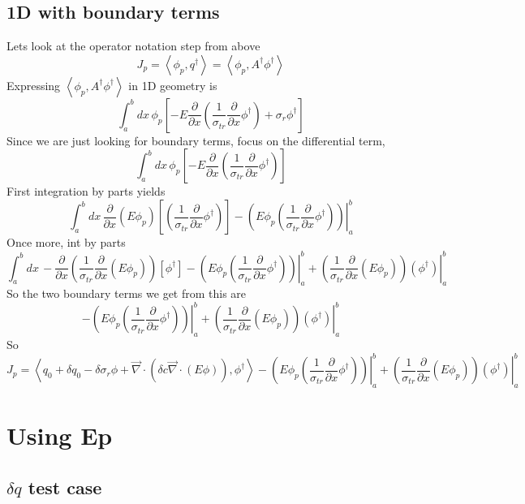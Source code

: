 \documentclass{article}
\newcommand{\bra}{\left\langle}
\newcommand{\ket}{\right\rangle}
\newcommand{\vdiv}{\vec{\nabla} \cdot}
\newcommand{\pdx}{\frac{\partial}{\partial x}}
\begin{document}
\subsection{1D with boundary terms}
Lets look at the operator notation step from above
\[
J_p = \bra \phi_p , q^\dag \ket = \bra \phi_p , A^\dag \phi^\dag\ket
\]
Expressing $\bra \phi_p , A^\dag \phi^\dag\ket$ in 1D geometry is
\[\int_a^b dx \, \phi_p \left[ - E  \pdx \left( \frac{1}{\sigma_{tr}} \pdx \phi^\dag \right) 
+ \sigma_r \phi^\dag \right]
\]
Since we are just looking for boundary terms, focus on the differential term,
\[\int_a^b dx \, \phi_p \left[ - E  \pdx \left( \frac{1}{\sigma_{tr}} \pdx \phi^\dag \right) \right]
\]
First integration by parts yields
\[\int_a^b dx \, \pdx \left( E \phi_p \right) \left[ \left( \frac{1}{\sigma_{tr}} \pdx \phi^\dag \right) \right] - \left. \left( E \phi_p   \left( \frac{1}{\sigma_{tr}} \pdx \phi^\dag \right) \right)  \right|_a^b
\]
Once more, int by parts
\[\int_a^b dx \,   - \pdx \left( \frac{1}{\sigma_{tr}} \pdx \left( E \phi_p \right) \right)  \left[ \phi^\dag \right] - \left. \left( E \phi_p   \left( \frac{1}{\sigma_{tr}} \pdx \phi^\dag \right) \right)  \right|_a^b + \left. \left( \frac{1}{\sigma_{tr}} \pdx \left( E \phi_p \right) \right) (\phi^\dag) \right|_a^b 
\]
So the two boundary terms we get from this are
\[
- \left. \left( E \phi_p   \left( \frac{1}{\sigma_{tr}} \pdx \phi^\dag \right) \right)  \right|_a^b + \left. \left( \frac{1}{\sigma_{tr}} \pdx \left( E \phi_p \right) \right) (\phi^\dag) \right|_a^b
\]
So
\[
J_p = \bra q_0 + \delta q_0 - \delta \sigma_r \phi + \vdiv \left( \delta c \vdiv \left( E \phi \right) \right), \phi^\dag \ket - \left. \left( E \phi_p   \left( \frac{1}{\sigma_{tr}} \pdx \phi^\dag \right) \right)  \right|_a^b + \left. \left( \frac{1}{\sigma_{tr}} \pdx \left( E \phi_p \right) \right) (\phi^\dag) \right|_a^b
\]



\section{Using Ep}
\subsection{$\delta q$ test case}
\end{document}
